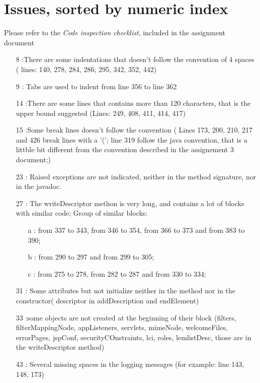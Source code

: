 \section{Issues, sorted by numeric index}
Please refer to the \textit{Code inspection checklist}, included in the assignment document

\begin{enumerate}
 \item [8]:There are some indentations that doesn't follow the convention of 4 spaces ( lines: 140, 278, 284, 286, 295, 342, 352, 442)
 \item [9]: Tabs are used to indent from line 356 to line 362
 \item [14]:There are some lines that contains more than 120 characters, that is the upper bound suggested (Lines: 249, 408, 411, 414, 417)
 \item [15]:Some break lines doesn't follow the convention ( Lines 173, 200, 210, 217 and 426 break lines with a '('; line 319 follow the java convention, that is a littble bit different from the convention described in the assignement 3 document;)
 \item [23]: Raised exceptions are not indicated, neither in the method signature, nor in the javadoc.
 \item [27]: The writeDescriptor methon is very long, and contains a lot of blocks with similar code; Group of similar blocks:
   \begin{itemize}
    \item[a]: from 337 to 343, from 346 to 354, from 366 to 373 and from 383 to 390;
    \item[b]: from 290 to 297 and from 299 to 305;
    \item[c]: from 275 to 278, from 282 to 287 and from 330 to 334;
   \end {itemize}
 \item[31]: Some attributes but not initialize neither in the method nor in the constructor( descriptor in addDescription and endElement)
 \item[33]:some objects are not created at the beginning of their block (filters, filterMappingNode, appListeners, servlets, mimeNode, welcomeFiles, errorPages, jspConf, securityCOnstraints, lci, roles, lemlistDesc, those are in the writeDescriptor method)
 \item [43]: Several missing spaces in the logging messages (for example: line 143, 148, 173)
\end{enumerate}
